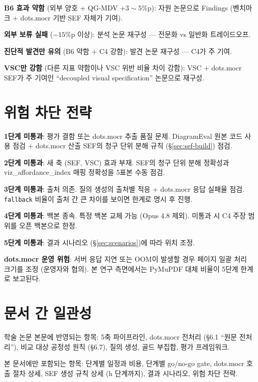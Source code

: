 \documentclass[11pt]{article}
\begin{document}
\textbf{B6 효과 약함} (외부 양호 + QG-MDV $+3\sim5\%$p): 자원 논문으로 Findings (벤치마크 + dots.mocr 기반 SEF 자체가 기여).

\textbf{외부 보류 실패} ($-15\%$p 이상): 분석 논문 재구성 — 전문화 vs 일반화 트레이드오프.

\textbf{진단적 발견만 유의} (B6 약함 + C4 강함): 발견 논문 재구성 — C4가 주 기여.

\textbf{VSC만 강함} (다른 지표 약함이나 VSC 위반 비율 차이 강함): VSC + dots.mocr SEF가 주 기여인 ``decoupled visual specification'' 논문으로 재구성.

\section{위험 차단 전략}

\textbf{1단계 미통과}: 평가 결함 또는 dots.mocr 추출 품질 문제. DiagramEval 원본 코드 사용 점검 + dots.mocr 산출 SEF의 청구 단위 분해 규칙 (\S \ref{sec:sef-build}) 점검.

\textbf{2단계 미통과}: 새 축 (SEF, VSC) 효과 부재. SEF의 청구 단위 분해 정확성과 viz\_affordance\_index 매핑 정확성을 5표본 수동 점검.

\textbf{3단계 미통과}: 출처 의존. 질의 생성의 출처별 적응 + dots.mocr 응답 실패율 점검. \texttt{fallback} 비율이 출처 간 큰 차이를 보이면 한계로 명시 후 진행.

\textbf{4단계 미통과}: 백본 종속. 특정 백본 교체 가능 (Opus 4.8 제외). 미통과 시 C4 주장 범위를 오픈 백본으로 한정.

\textbf{5단계 미통과}: 결과 시나리오 (\S \ref{sec:scenarios})에 따라 위치 조정.

\textbf{dots.mocr 운영 위험}: 서버 응답 지연 또는 OOM이 발생할 경우 페이지 일괄 처리 크기를 조정 (운영자와 협의). 본 연구 측면에서는 PyMuPDF 대체 비율이 5단계 한계로 보고된다.

\section{문서 간 일관성}

학술 논문 본문에 반영되는 항목: 5축 파이프라인, dots.mocr 전처리 (\S 6.1 ``원문 전처리''), 비교 대상 공정성 원칙 (\S 6.7), 질의 생성, 골드 부집합, 평가 프레임워크.

본 문서에만 포함되는 항목: 단계별 일정과 비용, 단계별 go/no-go gate, dots.mocr 호출 절차 상세, SEF 생성 규칙 상세 (h 단계까지), 결과 시나리오, 위험 차단 전략.
\end{document}

